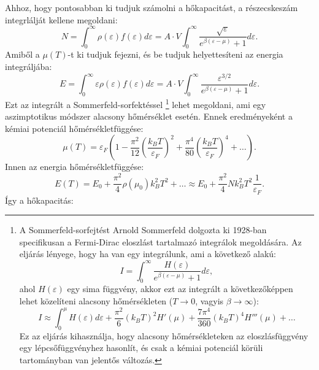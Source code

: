 \documentclass[../main.tex]{subfiles}
\begin{document}
Ahhoz, hogy pontosabban ki tudjuk számolni a hőkapacitást, a részecskeszám integrlálját kellene megoldani:
\begin{equation}
    N = \int_0^{\infty} \rho(\varepsilon) f(\varepsilon) d\varepsilon = A \cdot V \int_0^{\infty} \frac{\sqrt{\varepsilon}}{e^{\beta (\varepsilon - \mu)} + 1} d\varepsilon.
\end{equation}
Amiből a $\mu(T)$-t ki tudjuk fejezni, és be tudjuk helyettesíteni az energia integráljába:
\begin{equation}
    E = \int_0^{\infty} \varepsilon \rho(\varepsilon) f(\varepsilon) d\varepsilon = A \cdot V \int_0^{\infty} \frac{\varepsilon^{3/2}}{e^{\beta (\varepsilon - \mu)} + 1} d\varepsilon.
\end{equation}
Ezt az integrált a Sommerfeld-sorfektéssel
\footnote{
    A Sommerfeld-sorfejtést Arnold Sommerfeld dolgozta ki 1928-ban specifikusan a Fermi-Dirac eloszlást tartalmazó integrálok megoldására. 
    Az eljárás lényege, hogy ha van egy integrálunk, ami a következő alakú:
    \begin{equation*}
        I = \int_0^{\infty} \frac{H(\varepsilon)}{e^{\beta (\varepsilon - \mu)} + 1} d\varepsilon,
    \end{equation*}
    ahol $H(\varepsilon)$ egy sima függvény, akkor ezt az integrált a következőképpen lehet közelíteni alacsony hőmérsékleten ($T \to 0$, vagyis $\beta \to \infty$):
    \begin{equation*}
        I \approx \int_0^{\mu} H(\varepsilon) d\varepsilon + \frac{\pi^2}{6} (k_B T)^2 H'(\mu) + \frac{7 \pi^4}{360} (k_B T)^4 H'''(\mu) + \ldots
    \end{equation*}
    Ez az eljárás kihasználja, hogy alacsony hőmérsékleteken az eloszlásfüggvény egy lépcsőfüggvényhez hasonlít, és csak a kémiai potenciál körüli tartományban van jelentős változás.
}
lehet megoldani, ami egy aszimptotikus módszer alacsony hőmérséklet esetén. Ennek eredményeként a kémiai potenciál hőmérsékletfüggése:
\begin{equation}
    \mu(T) = \varepsilon_F \left( 1 - \frac{\pi^2}{12} \left( \frac{k_B T}{\varepsilon_F} \right)^2 + \frac{\pi^4}{80} \left( \frac{k_B T}{\varepsilon_F} \right)^4 + \ldots \right).
\end{equation}
Innen az energia hőmérsékletfüggése:
\begin{equation}
    E(T) = E_0 + \frac{\pi^2}{4} \rho(\mu_0) k^2_B T^2 + \ldots \approx E_0 + \frac{\pi^2}{4} N k_B^2 T^2 \frac{1}{\varepsilon_F}.
\end{equation}
Így a hőkapacitás:
\end{document}
